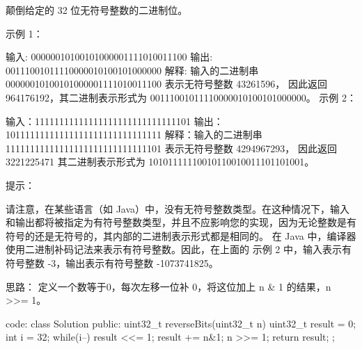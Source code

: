 颠倒给定的 32 位无符号整数的二进制位。

 

示例 1：

输入: 00000010100101000001111010011100
输出: 00111001011110000010100101000000
解释: 输入的二进制串 00000010100101000001111010011100 表示无符号整数 43261596，
      因此返回 964176192，其二进制表示形式为 00111001011110000010100101000000。
示例 2：

输入：11111111111111111111111111111101
输出：10111111111111111111111111111111
解释：输入的二进制串 11111111111111111111111111111101 表示无符号整数 4294967293，
      因此返回 3221225471 其二进制表示形式为 10101111110010110010011101101001。
 

提示：

请注意，在某些语言（如 Java）中，没有无符号整数类型。在这种情况下，输入和输出都将被指定为有符号整数类型，并且不应影响您的实现，因为无论整数是有符号的还是无符号的，其内部的二进制表示形式都是相同的。
在 Java 中，编译器使用二进制补码记法来表示有符号整数。因此，在上面的 示例 2 中，输入表示有符号整数 -3，输出表示有符号整数 -1073741825。



















思路：
定义一个数等于0，每次左移一位补 0，将这位加上 n & 1 的结果，n >>= 1。




















code:
class Solution {
public:
    uint32_t reverseBits(uint32_t n) {
        uint32_t result = 0;
        int i = 32;
        while(i--)
        {
            result <<= 1;
            result += n&1;
            n >>= 1;
        }
        return result;
    }
};